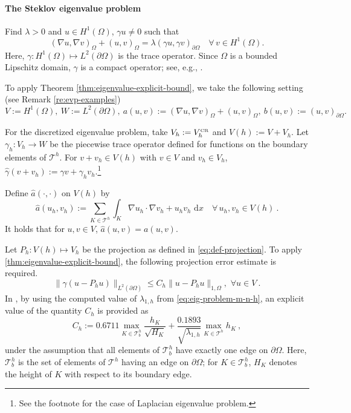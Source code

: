 \documentclass[a4,11pt]{article}
\numberwithin{equation}{section}
\newcommand{\ud}{\,\mbox{d}}
\newcommand{\CR}{\mbox{\tiny{CR}}}
\begin{document}
\paragraph{The Steklov eigenvalue problem} Find $\lambda >0$ and $u \in H^1(\Omega)$, $\gamma u \neq 0$ such that
\begin{equation}\label{eq:steklov_evp}
(\nabla u, \nabla v)_\Omega + (u,v)_\Omega=\lambda(\gamma u,\gamma v)_{\partial\Omega} \quad \forall\, v\in H^1(\Omega).
\end{equation}
Here, $\gamma:H^1(\Omega)\mapsto L^2(\partial\Omega)$ is the trace operator.
Since $\Omega$ is a bounded Lipschitz domain, $\gamma$ is a compact operator; see, e.g., \cite{Demengel-2012}.



To apply Theorem \ref{thm:eigenvalue-explicit-bound}, we take the following setting (see Remark \ref{re:evp-examples})
\begin{equation*}
	\label{eq:setting-for-steklov}
V:=H^1(\Omega), ~W:=L^2(\partial\Omega),~ 
{a(u,v)} := (\nabla u, \nabla v)_\Omega + (u,v)_\Omega,~
{b(u,v)} := (u,v)_{\partial\Omega}.
\end{equation*}

For the discretized eigenvalue problem, take  $V_h:=V_h^{\CR}$ and ${V}(h):=V+{V}_h$. Let ${\gamma_h}:V_h\to W$ be the piecewise trace operator defined for functions on the boundary elements of $\mathcal{T}^h$. For $v+v_h \in V(h)$ with $v\in V$ and $v_h\in V_h$, $\widehat{\gamma} (v+v_h):=\gamma v + \gamma_h v_h$.\footnote{See the footnote for the case of Laplacian eigenvalue problem.}

Define
$\widehat{a}(\cdot,\cdot)$ on  ${V}(h)$ by
\begin{equation}
\widehat{a}(u_h,v_h) := \sum_{K\in \mathcal{T}^h}\int_{K}\nabla u_h \cdot \nabla v_h +  u_h  v_h\,\ud x
                          \quad \forall\, u_h, v_h\in {V}(h)\:.
\end{equation}
It holds that for $u,v\in V$, $\widehat{a}(u,v)=a(u,v)$. 

\medskip

Let $P_h:V(h) \mapsto {V}_h$ be the  projection as defined in \cref{eq:def-projection}. 
To apply \cref{thm:eigenvalue-explicit-bound}, the following projection error estimate is required.
\begin{equation*}
\label{main_result_ch}
\|\gamma (u-P_h u)\|_{L^{2}(\partial \Omega)} \leq C_h \|u-P_h u\|_{1,\Omega},\,\,\forall u \in {V}\:.
\end{equation*}
%
In \cite{You-Xie-Liu-2019}, by using the computed value of $\lambda_{1,h}$ from \eqref{eq:eig-problem-m-n-h}, an explicit value of the quantity $C_h$  is provided as
\begin{equation}
\label{eq:C_h_definition_steklov}
C_h := 0.6711
        \max_{K\in \mathcal{T}_b^h}\frac{h_K}{\sqrt{H_K}}
      + \frac{0.1893}{\sqrt{\lambda_{1,h}}}\max_{K\in \mathcal{T}^h} h_K ~, 
\end{equation}
{under the assumption that all  elements of $\mathcal{T}^{h}_b$ have exactly one edge on $\partial \Omega$.}
Here, $\mathcal{T}_b^h$  is the set of elements of $\mathcal{T}^h$ having an edge on $\partial \Omega$;  for $K \in \mathcal{T}_b^h$, $H_K$ denotes the height of $K$ with respect to its boundary edge.
\end{document}
